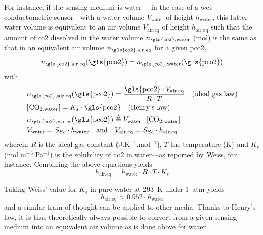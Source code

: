 For instance, if the sensing medium is water---\eg{} in the case of a wet conductometric sensor---with a water volume $V_\text{water}$ of height $h_\text{water}$, this latter water volume is equivalent to an air volume $V_\text{air,eq}$ of height $h_\text{air,eq}$ such that the amount of \gls{co2} dissolved in the water volume $n_\text{\gls{co2},water}$ (mol) is the same as that in an equivalent air volume $n_\text{\gls{co2},air,eq}$ for a given \gls{pco2}, \ie{}
\begin{equation}
	n_\text{\gls{co2},air,eq}(\text{\gls{pco2}}) = n_\text{\gls{co2},water}(\text{\gls{pco2}})
\end{equation}
with
\begin{equation}
	\begin{aligned}
		&n_\text{\gls{co2},air,eq}(\text{\gls{pco2}}) = \frac{\text{\gls{pco2}} \cdot V_\text{air,eq}}{R\cdot T} \quad \text{(ideal gas law)}\\
		&\ce{[CO_{2,water}]} = K_s \cdot \text{\gls{pco2}} \quad \text{(Henry's law)}\\
		&n_\text{\gls{co2},water}(\text{\gls{pco2}}) \triangleq V_\text{water} \cdot \ce{[CO_{2,water}]}\\
		&V_\text{water} = S_{Se} \cdot h_\text{water} \quad \text{and} \quad V_\text{air,eq} = S_{Se} \cdot h_\text{air,eq}\\
	\end{aligned}
\end{equation}
wherein $R$ is the ideal gas constant (J.K$^{-1}$.mol$^{-1}$), $T$ the temperature (K) and $K_s$ (mol.m$^{-3}$.Pa$^{-1}$) is the solubility of \gls{co2} in water---as reported by Weiss\cite{weiss1974}, for instance. Combining the above equations yields
\begin{equation}
	h_\text{air,eq} = h_\text{water} \cdot R \cdot T \cdot K_s
\end{equation}

Taking Weiss' value for $K_s$ in pure water at 293~K under 1~atm yields
\begin{equation}
	h_\text{air,eq} \approx 0.952 \cdot h_\text{water}
\end{equation}
and a similar train of thought can be applied to other media. Thanks to Henry's law, it is thus theoretically always possible to convert from a given sensing medium into an equivalent air volume as is done above for water.

